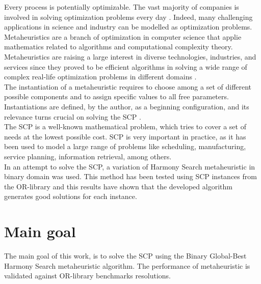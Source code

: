 Every process is potentially optimizable. The vast majority of companies is involved in solving optimization problems every day \cite{DBLP:books/daglib/0022645}. Indeed, many challenging applications in science and industry can be modelled as optimization problems.\\

Metaheuristics are a branch of optimization in computer science that applie mathematics related to algorithms and computational complexity theory. Metaheuristics are raising a large interest in diverse technologies, industries, and services since they proved to be efficient algorithms in solving a wide range of  complex real-life optimization problems in different domains \cite{DBLP:journals/pai/Torres-JimenezP14}.\\

The instantiation of a metaheuristic requires to choose among a set of different possible components and to assign specific values to all free parameters. Instantiations are defined, by the author, as a beginning configuration, and its relevance turns crucial on solving the SCP \cite{DBLP:conf/gecco/BirattariSPV02}.\\

The SCP is a well-known mathematical problem, which tries to cover a set of needs at the lowest possible cost. SCP is very important in practice, as it has been used to model a large range of problems like scheduling, manufacturing, service planning, information retrieval, among others.\\

In an attempt to solve the SCP, a variation of Harmony Search metaheuristic in binary domain  was used. This method has been tested using SCP instances from the OR-library \cite{citeulike:921349} and this results have shown that the developed algorithm generates good solutions for each instance.

\section{Main goal}
The main goal of this work, is to solve the SCP using the Binary Global-Best Harmony Search metaheuristic algorithm. The performance of metaheuristic is validated against OR-library benchmarks resolutions.

